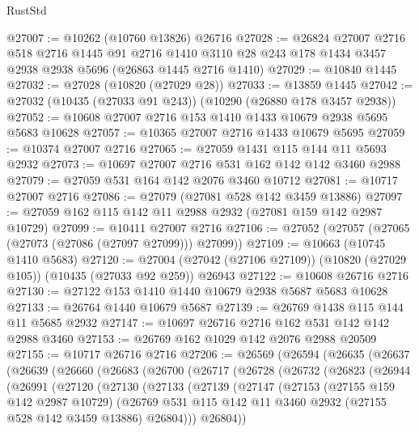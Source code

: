 \begin{lexlean}{RustStd}
\begin{coremodule}
@27007 := @10262 (@10760 @13826) @26716
@27028 := @26824
    @27007
    @2716
    @518
    @2716
    @1445
    @91
    @2716
    @1410
    @3110
    @28
    @243
    @178
    @1434
    @3457
    @2938
    @2938
    @5696
    (@26863 @1445 @2716 @1410)
@27029 := @10840 @1445
@27032 := @27028 (@10820 (@27029 @28))
@27033 := @13859 @1445
@27042 := @27032 (@10435 (@27033 @91 @243)) (@10290 (@26880 @178 @3457 @2938))
@27052 := @10608 @27007 @2716 @153 @1410 @1433 @10679 @2938 @5695 @5683 @10628
@27057 := @10365 @27007 @2716 @1433 @10679 @5695
@27059 := @10374 @27007 @2716
@27065 := @27059 @1431 @115 @144 @11 @5693 @2932
@27073 := @10697 @27007 @2716 @531 @162 @142 @142 @3460 @2988
@27079 := @27059 @531 @164 @142 @2076 @3460 @10712
@27081 := @10717 @27007 @2716
@27086 := @27079 (@27081 @528 @142 @3459 @13886)
@27097 := @27059 @162 @115 @142 @11 @2988 @2932 (@27081 @159 @142 @2987 @10729)
@27099 := @10411 @27007 @2716
@27106 := @27052 (@27057 (@27065 (@27073 (@27086 (@27097 @27099))) @27099))
@27109 := @10663 (@10745 @1410 @5683)
@27120 := @27004 (@27042 (@27106 @27109)) (@10820 (@27029 @105)) (@10435 (@27033 @92 @259)) @26943
@27122 := @10608 @26716 @2716
@27130 := @27122 @153 @1410 @1440 @10679 @2938 @5687 @5683 @10628
@27133 := @26764 @1440 @10679 @5687
@27139 := @26769 @1438 @115 @144 @11 @5685 @2932
@27147 := @10697 @26716 @2716 @162 @531 @142 @142 @2988 @3460
@27153 := @26769 @162 @1029 @142 @2076 @2988 @20509
@27155 := @10717 @26716 @2716
@27206 := @26569
    (@26594
      (@26635
        (@26637
          (@26639
            (@26660
              (@26683
                (@26700
                  (@26717
                    (@26728
                      (@26732
                        (@26823
                          (@26944
                            (@26991
                              (@27120
                                (@27130
                                  (@27133
                                    (@27139
                                      (@27147
                                        (@27153
                                          (@27155 @159 @142 @2987 @10729)
                                          (@26769
                                            @531
                                            @115
                                            @142
                                            @11
                                            @3460
                                            @2932
                                            (@27155 @528 @142 @3459 @13886)
                                            @26804)))
                                      @26804))

\end{coremodule}
\end{lexlean}
